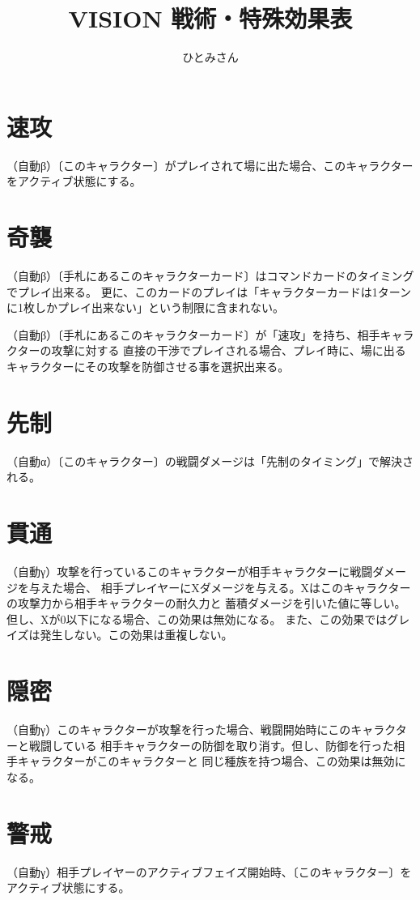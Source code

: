 \documentclass[
	fontsize=9pt,
	twocolumn,
	hanging_punctuation,
	paper=a4paper,
	gutter=15mm,
	fore-edge=15mm,
	head_space=15mm,
	foot_space=15mm,
]{jlreq}
\title{VISION 戦術・特殊効果表}
\author{ひとみさん}
\date{\warekitoday}
\newcommand{\↴}{{\jfontspec{nishiki-teki}↴}}
\begin{document}
\maketitle

\section*{速攻}
（自動β）〔このキャラクター〕がプレイされて場に出た場合、このキャラクターをアクティブ状態にする。

\section*{奇襲}
（自動β）〔手札にあるこのキャラクターカード〕はコマンドカードのタイミングでプレイ出来る。
更に、このカードのプレイは「キャラクターカードは1ターンに1枚しかプレイ出来ない」という制限に含まれない。

（自動β）〔手札にあるこのキャラクターカード〕が「速攻」を持ち、相手キャラクターの攻撃に対する
直接の干渉でプレイされる場合、プレイ時に、場に出るキャラクターにその攻撃を防御させる事を選択出来る。

\section*{先制}
（自動α）〔このキャラクター〕の戦闘ダメージは「先制のタイミング」で解決される。

\section*{貫通}
（自動γ）攻撃を行っているこのキャラクターが相手キャラクターに戦闘ダメージを与えた場合、
相手プレイヤーにXダメージを与える。Xはこのキャラクターの攻撃力から相手キャラクターの耐久力と
蓄積ダメージを引いた値に等しい。但し、Xが0以下になる場合、この効果は無効になる。
また、この効果ではグレイズは発生しない。この効果は重複しない。

\section*{隠密}
（自動γ）このキャラクターが攻撃を行った場合、戦闘開始時にこのキャラクターと戦闘している
相手キャラクターの防御を取り消す。但し、防御を行った相手キャラクターがこのキャラクターと
同じ種族を持つ場合、この効果は無効になる。

\pagebreak
\section*{警戒}
（自動γ）相手プレイヤーのアクティブフェイズ開始時、〔このキャラクター〕をアクティブ状態にする。
\end{document}
